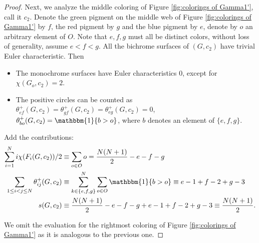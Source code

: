 \documentclass[12pt]{amsart}
\theoremstyle{definition}
\theoremstyle{remark}
\numberwithin{equation}{section}
\numberwithin{figure}{section}
\begin{document}
\begin{proof}
Next, we analyze the middle coloring of Figure \ref{fig:colorings of Gamma1'}, call it $c_2$. Denote the green pigment on the middle web of Figure \ref{fig:colorings of Gamma1'} by $f$, the red pigment by $g$ and the blue pigment by $e$, denote by $o$ an arbitrary element of $O$. Note that $e,f,g$ must all be distinct colors, without loss of generality, assume $e<f<g$. All the bichrome surfaces of $(G, c_2)$ have trivial Euler characteristic. Then
  \begin{itemize}
    \item The monochrome surfaces have Euler characteristics $0$, except for $\chi(G_{o}, c_2)=2$.
    \item The positive circles can be counted as $\theta^+_{ef}(G, c_2) = \theta^+_{gf}(G, c_2) = \theta^+_{eg}(G, c_2) = 0$, $\theta^+_{bo}(G, c_2) = \mathbbm{1}\{b > o\}$, where $b$ denotes an element of $\{e,f,g\}$.
  \end{itemize}
  Add the contributions:
  \begin{align*}
    \sum_{i=1}^N {i \chi(F_i(G,c_2))/2}  &\equiv \sum_{o \in O} o  = \frac{N(N+1)}{2} - e - f - g\\
    \sum_{1\leq i < j \leq N} \theta^+_{ij}(G,c_2) & \equiv \sum_{k \in \{e,f,g\}}^N\sum_{o \in O} \mathbbm{1}\{b > o\} \equiv e -1 + f -2 + g -3 \\
    s(G,c_2) &\equiv \frac{N(N+1)}{2} - e - f - g +  e -1 + f -2 + g -3 \equiv\frac{N(N+1)}{2}.
  \end{align*}

We omit the evaluation for the rightmost coloring of Figure \ref{fig:colorings of Gamma1'} as it is analogous to the previous one.
\end{proof}
\end{document}

